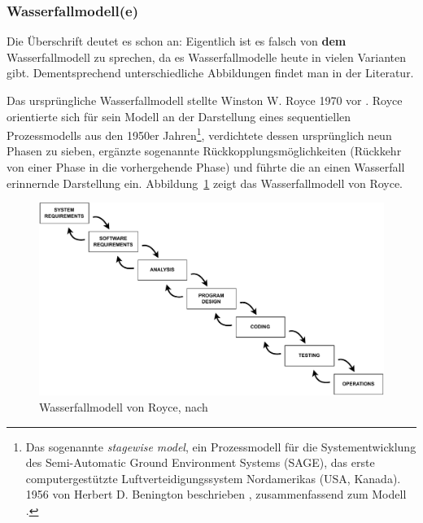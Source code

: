 \clearpage %

\subsubsection{Wasserfallmodell(e)}
\label{sec:Kap-2.2.1.1}

\vspace{\baselineskip} %


Die Überschrift deutet es schon an: Eigentlich ist es falsch von \textbf{dem} Wasserfallmodell zu sprechen, da es Wasserfallmodelle heute in vielen Varianten gibt. Dementsprechend unterschiedliche Abbildungen findet man in der Literatur.


Das ursprüngliche Wasserfallmodell stellte Winston W. Royce 1970 vor \cite{roy70}. \mbox{Royce} orientierte sich für sein Modell an der Darstellung eines sequentiellen Prozessmodells aus den 1950er Jahren\footnote{Das sogenannte \textit{stagewise model}, ein Prozessmodell für die Systementwicklung des Semi-Automatic Ground Environment Systems (SAGE), das erste computergestützte Luftverteidigungssystem Nordamerikas (USA, Kanada). 1956 von Herbert D. Benington beschrieben \cite{ben56}, zusammenfassend zum Modell \cite[43\psq]{kne17}.}, verdichtete dessen ursprünglich neun Phasen zu sieben, ergänzte sogenannte Rückkopplungsmöglichkeiten (Rückkehr von einer Phase in die vorhergehende Phase) und führte die an einen Wasserfall erinnernde Darstellung ein. Abbildung~\ref{fig:wasserfallmodel_nach_royce} zeigt das Wasserfallmodell von Royce.  

\begin{figure}[h!]
    \centering
    \includegraphics[width=1.0\textwidth]{Bilder/Kapitel-2/WasserfallmodellRoyce.pdf}
    \caption[Wasserfallmodell von Royce]{Wasserfallmodell von Royce, nach \cite[330]{roy70}}
    \label{fig:wasserfallmodel_nach_royce}
\end{figure}

